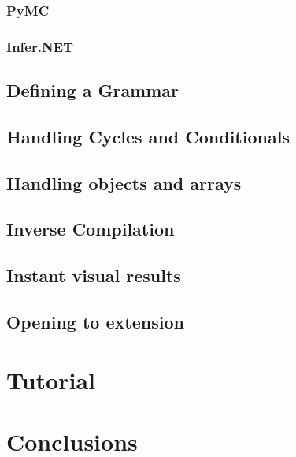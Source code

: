 \subsubsection{PyMC}

\subsubsection{Infer.NET}

\subsection{Defining a Grammar}

\subsection{Handling Cycles and Conditionals}

\subsection{Handling objects and arrays}

\subsection{Inverse Compilation}

\subsection{Instant visual results}

\subsection{Opening to extension}

\section{Tutorial}

\section{Conclusions}
